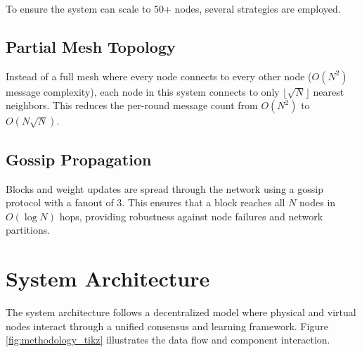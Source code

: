 To ensure the system can scale to 50+ nodes, several strategies are employed.

\subsection{Partial Mesh Topology}
Instead of a full mesh where every node connects to every other node ($O(N^2)$ message complexity), each node in this system connects to only $\lfloor\sqrt{N}\rfloor$ nearest neighbors. This reduces the per-round message count from $O(N^2)$ to $O(N\sqrt{N})$.

\subsection{Gossip Propagation}
Blocks and weight updates are spread through the network using a gossip protocol with a fanout of 3. This ensures that a block reaches all $N$ nodes in $O(\log N)$ hops, providing robustness against node failures and network partitions.

\section{System Architecture}

The system architecture follows a decentralized model where physical and virtual nodes interact through a unified consensus and learning framework. Figure \ref{fig:methodology_tikz} illustrates the data flow and component interaction.

